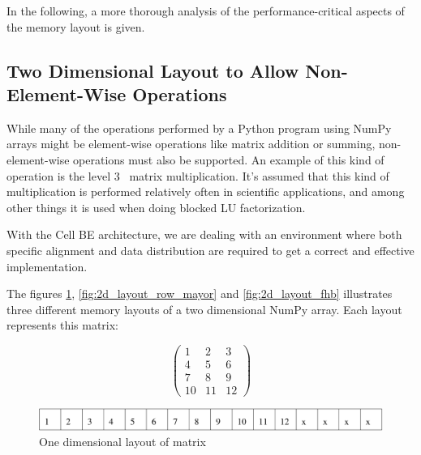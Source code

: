 In the following, a more thorough analysis of the performance-critical
aspects of the memory layout is given.

\subsection{Two Dimensional Layout to Allow Non-Element-Wise Operations}
\label{sec:fhbdescription}

While many of the operations performed by a Python program using NumPy
arrays might be element-wise operations like matrix addition or
summing, non-element-wise operations must also be supported. An
example of this kind of operation is the level 3 \BLAS\ matrix
multiplication. It's assumed that this kind of multiplication is
performed relatively often in scientific applications, and among other
things it is used when doing blocked LU factorization.



With the Cell BE architecture, we are dealing with an environment where
both specific alignment and data distribution are required to get a correct and effective implementation.

The figures \ref{fig:1d_layout}, \ref{fig:2d_layout_row_mayor}
and \ref{fig:2d_layout_fhb} illustrates three different memory layouts
of a two dimensional NumPy array. Each layout represents this matrix:

\[ \left( \begin{array}{cccc}
1 & 2 & 3 \\
4 & 5 & 6 \\
7 & 8 & 9 \\
10 & 11 & 12 \end{array} \right)\]

\begin{figure}
\begin{center}
\includegraphics[width=120mm]{./images/1d_layout.pdf}
\end{center}
\caption{One dimensional layout of matrix}
\label{fig:1d_layout}
\end{figure}


